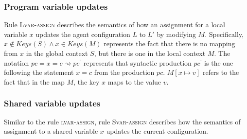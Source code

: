 \subsubsection{Program variable updates}
Rule \textsc{Lvar-assign} describes the semantics of how an assignment for a local variable $x$ updates the agent configuration $L$ to $L'$ by modifying $M$. Specifically, $x\notin \mathit{Keys}(S) \wedge x \in \mathit{Keys(M)}$ represents the fact that there is no mapping from $x$ in the global context $S$, but there is one in the local context $M$. The notation $\mathit{pc} = x = c \rightsquigarrow \mathit{pc}^\prime$ represents that syntactic production $\mathit{pc}^\prime$ is the one following the statement $x = c$ from the production $\mathit{pc}$. $M[x\mapsto v]$ refers to the fact that in the map $M$, the key $x$ maps to the value $v$. 

\begin{mdframed}
\scriptsize
{}
\end{mdframed}

\noindent
\subsubsection{Shared variable updates}
Similar to the rule \textsc{lvar-assign}, rule \textsc{Svar-assign} describes how the semantics of assignment to a shared variable $x$ updates the current configuration. 

